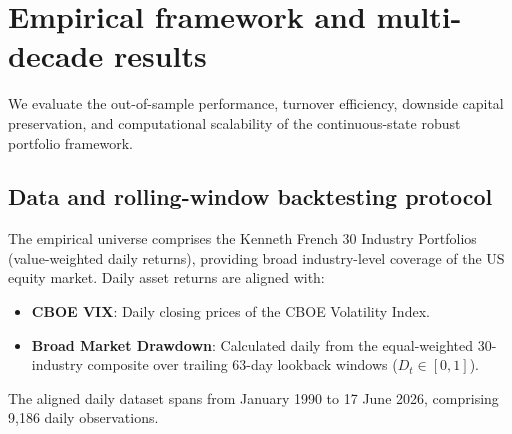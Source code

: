\documentclass[11pt, a4paper]{article}
\begin{document}
\section{Empirical framework and multi-decade results}
We evaluate the out-of-sample performance, turnover efficiency, downside capital preservation, and computational scalability of the continuous-state robust portfolio framework.

\subsection{Data and rolling-window backtesting protocol}
The empirical universe comprises the Kenneth French 30 Industry Portfolios (value-weighted daily returns), providing broad industry-level coverage of the US equity market. Daily asset returns are aligned with:
\begin{itemize}
    \item \textbf{CBOE VIX}: Daily closing prices of the CBOE Volatility Index.
    \item \textbf{Broad Market Drawdown}: Calculated daily from the equal-weighted 30-industry composite over trailing 63-day lookback windows ($D_t \in [0, 1]$).
\end{itemize}
The aligned daily dataset spans from January 1990 to 17 June 2026, comprising 9,186 daily observations.
\end{document}
